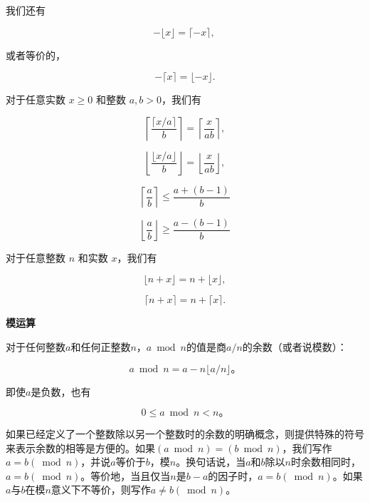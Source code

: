 \documentclass[lang=cn,newtx,10pt,scheme=chinese]{elegantbook}
\begin{document}
我们还有

\begin{equation}
-\lfloor x\rfloor=\lceil-x\rceil \text {, }
\end{equation}

或者等价的，

\begin{equation}
-\lceil x\rceil=\lfloor-x\rfloor .
\end{equation}

对于任意实数 $x \geq 0$ 和整数 $a, b>0$，我们有

\begin{equation}
\left\lceil\frac{\lceil x / a\rceil}{b}\right\rceil=\left\lceil\frac{x}{a b}\right\rceil,
\end{equation}

\begin{equation}
\left\lfloor\frac{\lfloor x / a\rfloor}{b}\right\rfloor=\left\lfloor\frac{x}{a b}\right\rfloor,
\end{equation}

\begin{equation}
\left\lceil\frac{a}{b}\right\rceil \leq \frac{a+(b-1)}{b}
\end{equation}

\begin{equation}
\left\lfloor\frac{a}{b}\right\rfloor \geq \frac{a-(b-1)}{b}
\end{equation}

对于任意整数 $n$ 和实数 $x$，我们有

\begin{equation}
\lfloor n+x\rfloor=n+\lfloor x\rfloor,
\end{equation}

\begin{equation}
\lceil n+x\rceil=n+\lceil x\rceil .
\end{equation}

\textbf{模运算}

对于任何整数$a$和任何正整数$n$，$a \bmod n$的值是商$a / n$的余数（或者说模数）：

\begin{equation}
a \bmod n=a-n\lfloor a / n\rfloor。
\end{equation}

即使$a$是负数，也有

\begin{equation}
0 \leq a \bmod n<n。
\end{equation}

如果已经定义了一个整数除以另一个整数时的余数的明确概念，则提供特殊的符号来表示余数的相等是方便的。如果$(a \bmod n)=(b \bmod n)$，我们写作$a=b(\bmod n)$，并说$a$等价于$b$，模$n$。换句话说，当$a$和$b$除以$n$时余数相同时，$a=b(\bmod n)$。等价地，当且仅当$n$是$b-a$的因子时，$a=b(\bmod n)$。如果$a$与$b$在模$n$意义下不等价，则写作$a \neq b(\bmod n)$。
\end{document}
